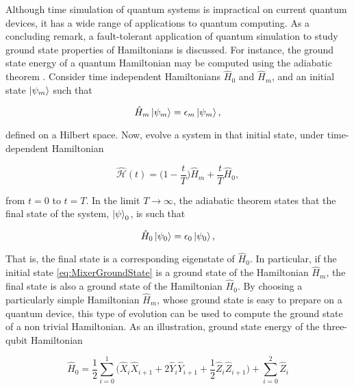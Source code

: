 Although time simulation of quantum systems is impractical on current quantum devices, it has a wide range of applications to quantum computing. As a concluding remark, a fault-tolerant application of quantum simulation to study ground state properties of Hamiltonians is discussed. For instance, the ground state energy of a quantum Hamiltonian may be computed using the adiabatic theorem \cite{Sakurai}. Consider time independent Hamiltonians $\hat{H}_0$ and $\hat{H}_m$, and an initial state $\ket{\psi_m}$ such that

\begin{equation}
    \hat{H}_m \ket{\psi_m} = \epsilon_m \ket{\psi_m},
    \label{eq:MixerGroundState}
\end{equation}

\noindent defined on a Hilbert space. Now, evolve a system in that initial state, under time-dependent Hamiltonian

\begin{equation}
    \hat{\mathcal{H}}(t) = \bigg(1-\frac{t}{T}\bigg)\hat{H}_m + \frac{t}{T}\hat{H}_0,
    \label{eq:AdiabaticHamiltonian}
\end{equation}

\noindent from $t=0$ to $t=T$. In the limit $T \rightarrow \infty$, the adiabatic theorem states that the final state of the system, $\ket{\psi}_0$, is such that 

\begin{equation}
    \hat{H}_0 \ket{\psi_0} = \epsilon_0 \ket{\psi_0},
    \label{eq:MixerGroundState}
\end{equation}

That is, the final state is a corresponding eigenstate of $\hat{H}_0$. In particular, if the initial state \ref{eq:MixerGroundState} is a ground state of the Hamiltonian $\hat{H}_m$, the final state is also a ground state of the Hamiltonian $\hat{H}_0$. By choosing a particularly simple Hamiltonian $\hat{H}_m$, whose ground state is easy to prepare on a quantum device, this type of evolution can be used to compute the ground state of a non trivial Hamiltonian. As an illustration, ground state energy of the three-qubit Hamiltonian

\begin{equation}
    \hat{H}_0 = \frac{1}{2}\sum_{i=0}^{1} \bigg(\hat{X}_i\hat{X}_{i+1} + 2\hat{Y}_i\hat{Y}_{i+1} + \frac{1}{2}\hat{Z}_i\hat{Z}_{i+1}\bigg) + \sum_{i=0}^{2} \hat{Z}_i
    \label{eq:AnnihilationHamiltonian}
\end{equation}


